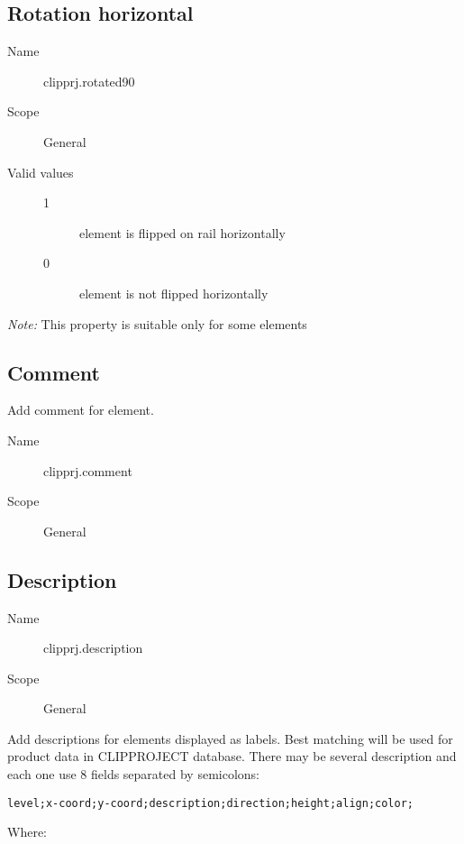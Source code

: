 \documentclass[%
	a4paper,
	oneside,
	listof=numbered,
	parskip=half,
	headsepline=true,
	footsepline=false,
	0.7headlines,
	]{scrbook}
\begin{document}
\subsection{Rotation horizontal}

\begin{description}
	\item[Name] clipprj.rotated90
	\item[Scope] General
	\item[Valid values]
	\begin{description}
		\item[1] element is flipped on rail horizontally
		\item[0] element is not flipped horizontally
	\end{description}
\end{description}

\emph{Note:} This property is suitable only for some elements

\subsection{Comment}

Add comment for element.

\begin{description}
	\item[Name] clipprj.comment
	\item[Scope] General
\end{description}

\subsection{Description}

\begin{description}
	\item[Name] clipprj.description
	\item[Scope] General
\end{description}

Add descriptions for elements displayed as labels.
Best matching will be used for product data in CLIPPROJECT database.
There may be several description and each one use 8 fields separated by semicolons:

\verb|level;x-coord;y-coord;description;direction;height;align;color;|

Where:
\end{document}
